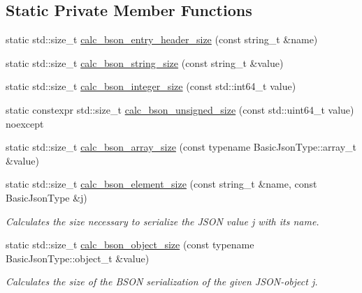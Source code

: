 \subsection*{Static Private Member Functions}
\begin{DoxyCompactItemize}
\item 
static std\+::size\+\_\+t \mbox{\hyperlink{classnlohmann_1_1detail_1_1binary__writer_a5bae2f1db2c511b869dffaddf15a1653}{calc\+\_\+bson\+\_\+entry\+\_\+header\+\_\+size}} (const string\+\_\+t \&name)
\item 
static std\+::size\+\_\+t \mbox{\hyperlink{classnlohmann_1_1detail_1_1binary__writer_aea44fd97a5cb9b4f175e66e3e4fdf158}{calc\+\_\+bson\+\_\+string\+\_\+size}} (const string\+\_\+t \&value)
\item 
static std\+::size\+\_\+t \mbox{\hyperlink{classnlohmann_1_1detail_1_1binary__writer_aeab70c895931b96ea598306b37eca271}{calc\+\_\+bson\+\_\+integer\+\_\+size}} (const std\+::int64\+\_\+t value)
\item 
static constexpr std\+::size\+\_\+t \mbox{\hyperlink{classnlohmann_1_1detail_1_1binary__writer_aa1d6bb9f3af16f07ce2440c354b5787b}{calc\+\_\+bson\+\_\+unsigned\+\_\+size}} (const std\+::uint64\+\_\+t value) noexcept
\item 
static std\+::size\+\_\+t \mbox{\hyperlink{classnlohmann_1_1detail_1_1binary__writer_af08f9302a02516ff8cf358a99aaa1ddf}{calc\+\_\+bson\+\_\+array\+\_\+size}} (const typename Basic\+Json\+Type\+::array\+\_\+t \&value)
\item 
static std\+::size\+\_\+t \mbox{\hyperlink{classnlohmann_1_1detail_1_1binary__writer_a1e4372c5984184eb5bcc09af1fcc2ee0}{calc\+\_\+bson\+\_\+element\+\_\+size}} (const string\+\_\+t \&name, const Basic\+Json\+Type \&j)
\begin{DoxyCompactList}\small\item\em Calculates the size necessary to serialize the J\+S\+ON value {\itshape j} with its {\itshape name}. \end{DoxyCompactList}\item 
static std\+::size\+\_\+t \mbox{\hyperlink{classnlohmann_1_1detail_1_1binary__writer_acc6f1cc1fd370ee84ebc8cf7b8712840}{calc\+\_\+bson\+\_\+object\+\_\+size}} (const typename Basic\+Json\+Type\+::object\+\_\+t \&value)
\begin{DoxyCompactList}\small\item\em Calculates the size of the B\+S\+ON serialization of the given J\+S\+O\+N-\/object {\itshape j}. \end{DoxyCompactList}\item 

\end{DoxyCompactItemize}
